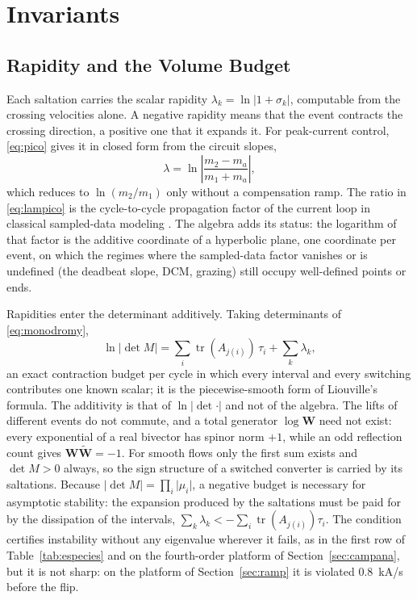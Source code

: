 \documentclass[journal]{IEEEtran}
\newcommand{\rev}[1]{\widetilde{#1}}
\begin{document}
\section{Invariants}
\label{sec:invariants}

\subsection{Rapidity and the Volume Budget}
Each saltation carries the scalar rapidity $\lambda_k=\ln\lvert 1+\sigma_k\rvert$,
computable from the crossing velocities alone. A negative rapidity means that
the event contracts the crossing direction, a positive one that it expands
it. For peak-current control, \eqref{eq:pico} gives it in closed form from
the circuit slopes,
\begin{equation}
\lambda=\ln\left\lvert\frac{m_2-m_a}{m_1+m_a}\right\rvert ,
\label{eq:lampico}
\end{equation}
which reduces to $\ln(m_2/m_1)$ only without a compensation ramp. The ratio
in \eqref{eq:lampico} is the cycle-to-cycle propagation factor of the current
loop in classical sampled-data modeling
\cite{ridley1991new,erickson2020fundamentals}. The algebra adds its status:
the logarithm of that factor is the additive coordinate of a hyperbolic
plane, one coordinate per event, on which the regimes where the sampled-data
factor vanishes or is undefined (the deadbeat slope, DCM, grazing) still
occupy well-defined points or ends.

Rapidities enter the determinant additively. Taking determinants of
\eqref{eq:monodromy},
\begin{equation}
\ln\lvert\det M\rvert=\sum_i \operatorname{tr}(A_{j(i)})\,\tau_i
                      +\sum_k \lambda_k ,
\label{eq:budget}
\end{equation}
an exact contraction budget per cycle in which every interval and every
switching contributes one known scalar; it is the piecewise-smooth form of
Liouville's formula. The additivity is that of $\ln\lvert\det\cdot\rvert$
and not of the algebra. The lifts of different events do not commute, and a
total generator $\log\bm{W}$ need not exist: every exponential of a real
bivector has spinor norm $+1$, while an odd reflection count gives
$\bm{W}\rev{\bm{W}}=-1$. For smooth flows only the first sum exists and
$\det M>0$ always, so the sign structure of a switched converter is carried
by its saltations. Because $\lvert\det M\rvert=\prod_i\lvert\mu_i\rvert$, a
negative budget is necessary for asymptotic stability: the expansion
produced by the saltations must be paid for by the dissipation of the
intervals, $\sum_k\lambda_k<-\sum_i\operatorname{tr}(A_{j(i)})\tau_i$. The
condition certifies instability without any eigenvalue wherever it fails, as
in the first row of Table~\ref{tab:especies} and on the fourth-order platform
of Section~\ref{sec:campana}, but it is not sharp: on the platform of
Section~\ref{sec:ramp} it is violated $0.8$~kA/s before the flip.
\end{document}
